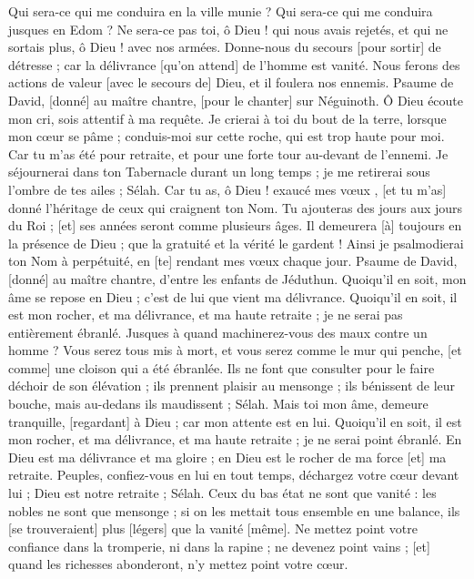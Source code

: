 \begin{multicols}{2}
Qui sera-ce qui me conduira en la ville munie ? Qui sera-ce qui me conduira jusques en Edom ?
Ne sera-ce pas toi, ô Dieu ! qui nous avais rejetés, et qui ne sortais plus, ô Dieu ! avec nos armées.
Donne-nous du secours [pour sortir] de détresse ; car la délivrance [qu'on attend] de l'homme est vanité.
Nous ferons des actions de valeur [avec le secours de] Dieu, et il foulera nos ennemis.
\VerseOne{}Psaume de David, [donné] au maître chantre, [pour le chanter] sur Néguinoth. Ô Dieu écoute mon cri, sois attentif à ma requête.
Je crierai à toi du bout de la terre, lorsque mon cœur se pâme ; conduis-moi sur cette roche, qui est trop haute pour moi.
Car tu m'as été pour retraite, et pour une forte tour au-devant de l'ennemi.
Je séjournerai dans ton Tabernacle durant un long temps ; je me retirerai sous l'ombre de tes ailes ; Sélah.
Car tu as, ô Dieu ! exaucé mes vœux , [et tu m'as] donné l'héritage de ceux qui craignent ton Nom.
Tu ajouteras des jours aux jours du Roi ; [et] ses années seront comme plusieurs âges.
Il demeurera [à] toujours en la présence de Dieu ; que la gratuité et la vérité le gardent !
Ainsi je psalmodierai ton Nom à perpétuité, en [te] rendant mes vœux chaque jour.
\VerseOne{}Psaume de David, [donné] au maître chantre, d'entre les enfants de Jéduthun. Quoiqu'il en soit, mon âme se repose en Dieu ; c'est de lui que vient ma délivrance.
Quoiqu'il en soit, il est mon rocher, et ma délivrance, et ma haute retraite ; je ne serai pas entièrement ébranlé.
Jusques à quand machinerez-vous des maux contre un homme ? Vous serez tous mis à mort, et vous serez comme le mur qui penche, [et comme] une cloison qui a été ébranlée.
Ils ne font que consulter pour le faire déchoir de son élévation ; ils prennent plaisir au mensonge ; ils bénissent de leur bouche, mais au-dedans ils maudissent ; Sélah.
Mais toi mon âme, demeure tranquille, [regardant] à Dieu ; car mon attente est en lui.
Quoiqu'il en soit, il est mon rocher, et ma délivrance, et ma haute retraite ; je ne serai point ébranlé.
En Dieu est ma délivrance et ma gloire ; en Dieu est le rocher de ma force [et] ma retraite.
Peuples, confiez-vous en lui en tout temps, déchargez votre cœur devant lui ; Dieu est notre retraite ; Sélah.
Ceux du bas état ne sont que vanité : les nobles ne sont que mensonge ; si on les mettait tous ensemble en une balance, ils [se trouveraient] plus [légers] que la vanité [même].
Ne mettez point votre confiance dans la tromperie, ni dans la rapine ; ne devenez point vains ; [et] quand les richesses abonderont, n'y mettez point votre cœur.

\end{multicols}
